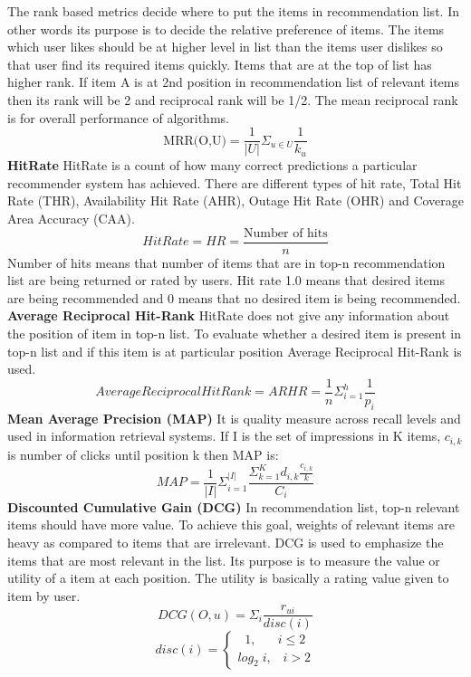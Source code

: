 The rank based metrics decide where to put the items in recommendation list. In other words its purpose is to decide the relative preference of items\cite{Metrics2}. The items which user likes should be at higher level in list than the items user dislikes so that user find its required items quickly. Items that are at the top of list has higher rank. If item A is at 2nd position in recommendation list of relevant items then its rank will be 2 and reciprocal rank will be 1/2. The mean reciprocal rank is for overall performance of algorithms. 
\[\textrm{MRR(O,U)} = \frac{1}{|U|} \Sigma_{u\in U} \frac{1}{k_u}\] 
\newline
\textbf{HitRate}
HitRate is a count of how many correct predictions a particular recommender system has achieved. There are different types of hit rate, Total Hit Rate (THR), Availability Hit Rate (AHR), Outage Hit Rate (OHR) and Coverage Area Accuracy (CAA)\cite{Metrics3}. 
\[HitRate = HR = \frac{\textrm{Number of hits}}{n} \]
Number of hits means that number of items that are in top-n recommendation list are being returned or rated by users\cite{Metrics4}. Hit rate 1.0 means that desired items are being recommended and 0 means that no desired item is being recommended.
\\
\textbf{Average Reciprocal Hit-Rank} 
HitRate does not give any information about the position of item in top-n list. To evaluate whether a desired item is present in top-n list and if this item is at particular position Average Reciprocal Hit-Rank is used\cite{Metrics4}.
\[Average Reciprocal HitRank = ARHR = \frac{1}{n}\Sigma_{i=1}^h\frac{1}{p_i} \]
\newline
\textbf{Mean Average Precision (MAP)}\newline
It is quality measure across recall levels and used in information retrieval systems\cite{p4-2}. If I is the set of impressions in K items, $c_{i,k}$ is number of clicks until position k then MAP is:
\[MAP = \frac{1}{|I|}\Sigma_{i=1}^{|I|}\frac{\Sigma_{k=1}^K d_{i,k} \frac{c_{i,k}}{k}}{C_i} \]
\textbf{Discounted Cumulative Gain (DCG)}\newline
In recommendation list, top-n relevant items should have more value. To achieve this goal, weights of relevant items are heavy as compared to items that are irrelevant. DCG is used to emphasize the items that are most relevant in the list. Its purpose is to measure the value or utility of a item at each position. The utility is basically a rating value given to item by user. 
\[DCG(O,u) = \Sigma_i\frac{r_{ui}}{disc(i)}\]
\[disc(i) = \begin{cases}
      \;\;1,\;\;\;\;\;\;i\leq2\\
      log_2\; i ,\;\;\;i > 2
    \end{cases}\]
